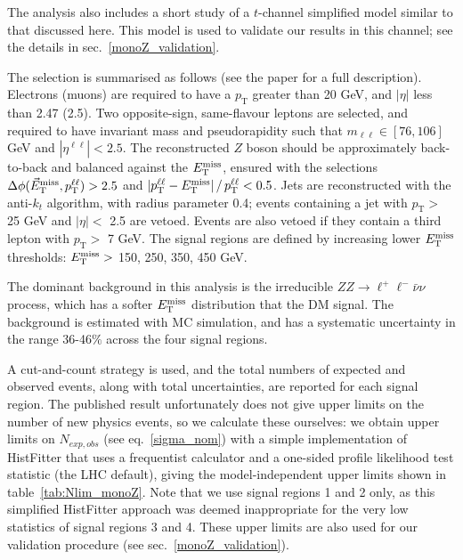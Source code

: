 The analysis also includes a short study of a $t$-channel simplified model similar to that discussed here. This model is used to validate our results in this channel; see the details in sec.~\ref{monoZ_validation}.

The selection is summarised as follows (see the paper for a full description). Electrons (muons) are required to have a $p_{\mathrm{T}}$ greater than 20 GeV, and $|\eta|$ less than 2.47 (2.5). Two opposite-sign, same-flavour leptons are selected, and required to have invariant mass and pseudorapidity such that $m_{\ell \ell} \in [76, 106]$ GeV and $|\eta^{\ell \ell}| < 2.5$. The reconstructed $Z$ boson should be approximately back-to-back and balanced against the $E_{\mathrm{T}}^{\mathrm{miss}}$, ensured with the selections $\Delta \phi (\vec{E}_{\mathrm{T}}^{\mathrm{miss}}, p_{\mathrm{T}}^{\ell \ell}) > 2.5$ and $| p_{\mathrm{T}}^{\ell \ell} - E_{\mathrm{T}}^{\mathrm{miss}} | \, /  \, p_{\mathrm{T}}^{\ell \ell} < 0.5$. Jets are reconstructed with the anti-$k_t$ algorithm, with radius parameter 0.4; events containing a jet with $p_{\mathrm{T}}>$ 25 GeV and $|\eta|< $ 2.5 are vetoed. Events are also vetoed if they contain a third lepton with $p_{\mathrm{T}}>$ 7 GeV. The signal regions are defined by increasing lower $E_{\mathrm{T}}^{\mathrm{miss}}$ thresholds: $E_{\mathrm{T}}^{\mathrm{miss}} >$ 150, 250, 350, 450 GeV.


The dominant background in this analysis is the irreducible $ZZ \rightarrow \ell^+ \ell^- \bar{\nu} \nu$ process, which has a softer $E_{\mathrm{T}}^{\mathrm{miss}}$ distribution that the DM signal. The background is estimated with MC simulation, and has a systematic uncertainty in the range 36-46$\%$ across the four signal regions.

A cut-and-count strategy is used, and the total numbers of expected and observed events, along with total uncertainties, are reported for each signal region. The published result unfortunately does not give upper limits on the number of new physics events, so we calculate these ourselves: we obtain upper limits on $N_{exp,obs}$ (see eq.~\ref{sigma_nom}) with a simple implementation of HistFitter that uses a frequentist calculator and a one-sided profile likelihood test statistic (the LHC default), giving the model-independent upper limits shown in table~\ref{tab:Nlim_monoZ}. Note that we use signal regions 1 and 2 only, as this simplified HistFitter approach was deemed inappropriate for the very low statistics of signal regions 3 and 4. These upper limits are also used for our validation procedure (see sec.~\ref{monoZ_validation}).

